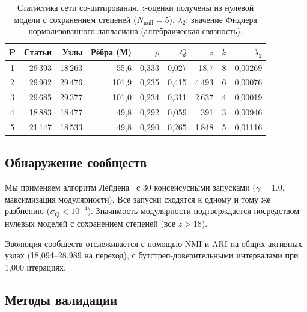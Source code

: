 \documentclass[11pt]{article}
\begin{document}
\begin{table}[t]
\centering
\small
\caption{Статистика сети со-цитирования. $z$-оценки получены из нулевой модели с сохранением степеней ($N_{\text{null}} = 5$). $\lambda_2$: значение Фидлера нормализованного лапласиана (алгебраическая связность).}
\label{tab:cocitation}
\begin{tabular}{@{}crrrrrrrr@{}}
\toprule
\textbf{P} & \textbf{Статьи} & \textbf{Узлы} & \textbf{Рёбра (М)} & $\rho$ & \textbf{$Q$} & \textbf{$z$} & \textbf{$k$} & $\lambda_2$ \\
\midrule
1 & 29\,393 & 18\,263 & 55{,}6 & 0{,}333 & 0{,}027 & 18{,}7 & 8 & 0{,}00269 \\
2 & 29\,902 & 29\,476 & 101{,}9 & 0{,}235 & 0{,}415 & 4\,493 & 6 & 0{,}00076 \\
3 & 29\,685 & 29\,377 & 101{,}0 & 0{,}234 & 0{,}311 & 2\,637 & 4 & 0{,}00019 \\
4 & 18\,883 & 18\,477 & 49{,}8 & 0{,}292 & 0{,}059 & 391 & 3 & 0{,}00946 \\
5 & 21\,147 & 18\,533 & 49{,}8 & 0{,}290 & 0{,}265 & 1\,848 & 5 & 0{,}01116 \\
\bottomrule
\end{tabular}
\end{table}

\subsection{Обнаружение сообществ}

Мы применяем алгоритм Лейдена~\citep{traag2019louvain} с 30 консенсусными запусками ($\gamma = 1.0$, максимизация модулярности).
Все запуски сходятся к одному и тому же разбиению ($\sigma_Q < 10^{-4}$).
Значимость модулярности подтверждается посредством нулевых моделей с сохранением степеней (все $z > 18$).

Эволюция сообществ отслеживается с помощью NMI и ARI на общих активных узлах (18{,}094--28{,}989 на переход), с бутстреп-доверительными интервалами при 1{,}000 итерациях.

\subsection{Методы валидации}
\end{document}

